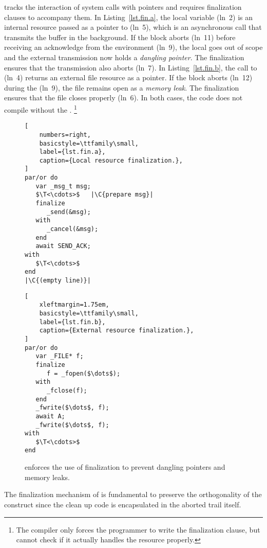 \CEU tracks the interaction of system calls with pointers and requires
finalization clauses to accompany them.
%
In Listing~\ref{lst.fin.a}, the local variable 
(ln~2) is an internal resource passed as a pointer to  (ln~5),
which is an asynchronous call that transmits the buffer in the background.
If the block aborts (ln~11) before receiving an acknowledge from the
environment (ln~9), the local  goes out of scope and the external
transmission now holds a \emph{dangling pointer}.
The finalization ensures that the transmission also aborts (ln~7).
%
In Listing~\ref{lst.fin.b}, the call to  (ln~4) returns an
external file resource as a pointer.
If the block aborts (ln~12) during the  (ln~9), the file
remains open as a \emph{memory leak}.
The finalization ensures that the file closes properly (ln~6).
%
In both cases, the code does not compile without the .%
\footnote{%
The compiler only forces the programmer to write the finalization clause, but
cannot check if it actually handles the resource properly.}

\begin{figure}[b!]
\begin{minipage}[t]{0.45\linewidth}
\begin{lstlisting}[
    numbers=right,
    basicstyle=\ttfamily\small,
    label={lst.fin.a},
    caption={Local resource finalization.},
]
par/or do
   var _msg_t msg;
   $\T<\cdots>$   |\C{prepare msg}|
   finalize
      _send(&msg);
   with
      _cancel(&msg);
   end
   await SEND_ACK;
with
   $\T<\cdots>$
end
|\C{(empty line)}|
\end{lstlisting}
\end{minipage}%
%
\begin{minipage}[t]{0.53\linewidth}
\begin{lstlisting}[
    xleftmargin=1.75em,
    basicstyle=\ttfamily\small,
    label={lst.fin.b},
    caption={External resource finalization.},
]
par/or do
   var _FILE* f;
   finalize
      f = _fopen($\dots$);
   with
      _fclose(f);
   end
   _fwrite($\dots$, f);
   await A;
   _fwrite($\dots$, f);
with
   $\T<\cdots>$
end
\end{lstlisting}
\end{minipage}%
\caption{%
\CEU enforces the use of finalization to prevent dangling pointers and memory leaks.}
\label{lst.fin}
\end{figure}

The finalization mechanism of \CEU is fundamental to preserve the orthogonality
of the  construct since the clean up code is encapsulated in the
aborted trail itself.
